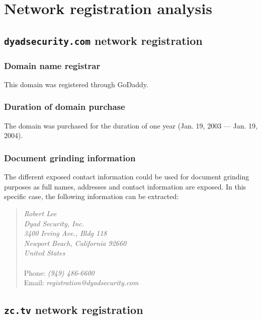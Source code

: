 \section{Network registration analysis}

\subsection{\texttt{dyadsecurity.com} network registration}

\subsubsection{Domain name registrar}

This domain was registered through GoDaddy.

\subsubsection{Duration of domain purchase}

The domain was purchased for the duration of one year (Jan. 19, 2003 --- Jan. 19, 2004).

\subsubsection{Document grinding information}

The different exposed contact information could be used for document grinding purposes as full names, addresses and contact information are exposed. In this specific case, the following information can be extracted:

\begin{quote}
\textit{Robert Lee\\
Dyad Security, Inc.\\
3400 Irving Ave., Bldg 118\\
Newport Beach, California 92660\\
United States}\\
\\
Phone: \textit{(949) 486-6600}\\
Email: \textit{registration@dyadsecurity.com}
\end{quote}



\subsection{\texttt{zc.tv} network registration}

